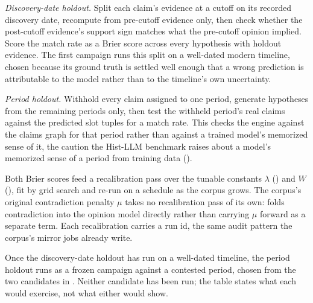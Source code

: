 \documentclass[11pt]{article}
\begin{document}
\emph{Discovery-date holdout.} Split each claim's evidence at a cutoff on
its recorded discovery date, recompute  from
pre-cutoff evidence only, then check whether the post-cutoff evidence's
support sign matches what the pre-cutoff opinion implied. Score the match
rate as a Brier score across every hypothesis with holdout evidence. The
first campaign runs this split on a well-dated modern timeline, chosen
because its ground truth is settled well enough that a wrong prediction
is attributable to the model rather than to the timeline's own
uncertainty.

\emph{Period holdout.} Withhold every claim assigned to one period,
generate hypotheses from the remaining periods only, then test the
withheld period's real claims against the predicted slot tuples for a
match rate. This checks the engine against the claims graph for that
period rather than against a trained model's memorized sense of it, the
caution the Hist-LLM benchmark raises about a model's memorized sense of
a period from training data ().

Both Brier scores feed a recalibration pass over the tunable constants
$\lambda$ () and $W$ (), fit by
grid search and re-run on a schedule as the corpus grows. The corpus's
original contradiction penalty $\mu$ takes no recalibration pass of its
own:  folds contradiction into the opinion model
directly rather than carrying $\mu$ forward as a separate term. Each
recalibration carries a run id, the same audit pattern the corpus's
mirror jobs already write.

Once the discovery-date holdout has run on a well-dated timeline, the
period holdout runs as a frozen campaign against a contested period,
chosen from the two candidates in . Neither
candidate has been run; the table states what each would exercise, not
what either would show.
\end{document}

